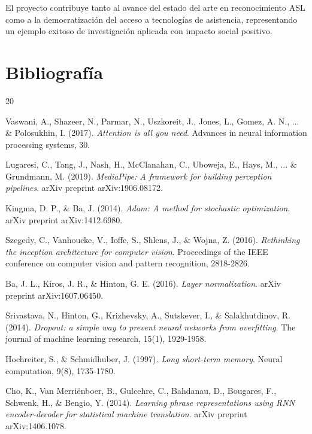 \documentclass[12pt,a4paper]{article}
\begin{document}
El proyecto contribuye tanto al avance del estado del arte en reconocimiento ASL como a la democratización del acceso a tecnologías de asistencia, representando un ejemplo exitoso de investigación aplicada con impacto social positivo.

\section{Bibliografía}

\begin{thebibliography}{20}

Vaswani, A., Shazeer, N., Parmar, N., Uszkoreit, J., Jones, L., Gomez, A. N., ... \& Polosukhin, I. (2017). 
\textit{Attention is all you need}. 
Advances in neural information processing systems, 30.

Lugaresi, C., Tang, J., Nash, H., McClanahan, C., Uboweja, E., Hays, M., ... \& Grundmann, M. (2019). 
\textit{MediaPipe: A framework for building perception pipelines}. 
arXiv preprint arXiv:1906.08172.

Kingma, D. P., \& Ba, J. (2014). 
\textit{Adam: A method for stochastic optimization}. 
arXiv preprint arXiv:1412.6980.

Szegedy, C., Vanhoucke, V., Ioffe, S., Shlens, J., \& Wojna, Z. (2016). 
\textit{Rethinking the inception architecture for computer vision}. 
Proceedings of the IEEE conference on computer vision and pattern recognition, 2818-2826.

Ba, J. L., Kiros, J. R., \& Hinton, G. E. (2016). 
\textit{Layer normalization}. 
arXiv preprint arXiv:1607.06450.

Srivastava, N., Hinton, G., Krizhevsky, A., Sutskever, I., \& Salakhutdinov, R. (2014). 
\textit{Dropout: a simple way to prevent neural networks from overfitting}. 
The journal of machine learning research, 15(1), 1929-1958.

Hochreiter, S., \& Schmidhuber, J. (1997). 
\textit{Long short-term memory}. 
Neural computation, 9(8), 1735-1780.

Cho, K., Van Merriënboer, B., Gulcehre, C., Bahdanau, D., Bougares, F., Schwenk, H., \& Bengio, Y. (2014). 
\textit{Learning phrase representations using RNN encoder-decoder for statistical machine translation}. 
arXiv preprint arXiv:1406.1078.


\end{thebibliography}
\end{document}
